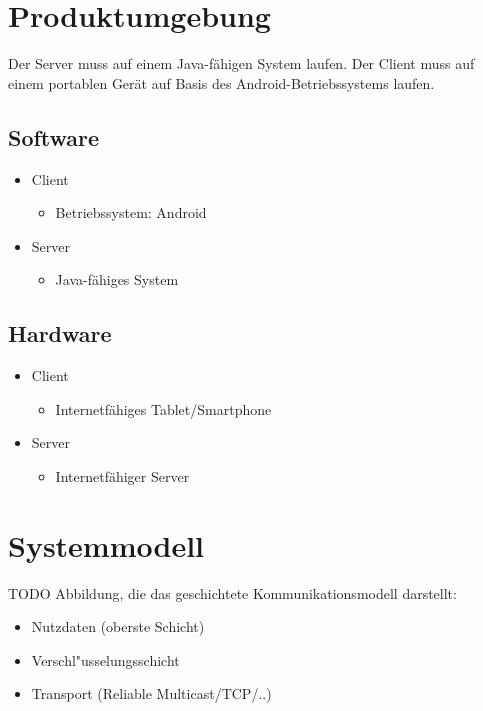\documentclass[a4paper,10pt]{scrartcl}
\begin{document}
\section{Produktumgebung}
Der Server muss auf einem Java-fähigen System laufen.
Der Client muss auf einem portablen Gerät auf Basis des Android-Betriebssystems laufen.
\subsection{Software}
\begin{itemize}
\item Client
   \begin{itemize}
      \item Betriebssystem: Android
   \end{itemize}
\item Server
   \begin{itemize}
      \item Java-fähiges System
   \end{itemize}
\end{itemize}

\subsection{Hardware}
\begin{itemize}
\item Client
   \begin{itemize}
      \item Internetfähiges Tablet/Smartphone
   \end{itemize}
\item Server
   \begin{itemize}
      \item Internetfähiger Server
   \end{itemize}
\end{itemize}

\section{Systemmodell}




TODO Abbildung, die das geschichtete Kommunikationsmodell darstellt:

\begin{itemize}
   \item Nutzdaten (oberste Schicht)
   \item Verschl"usselungsschicht
   \item Transport (Reliable Multicast/TCP/..)
\end{itemize}
\end{document}
